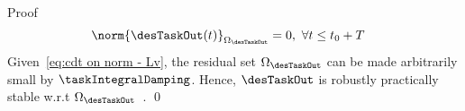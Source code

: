 \begin{custumProof}{Proof}
\begin{align}
\begin{split}
			\norm{\desTaskOut(t) }_{\Omega_\desTaskOut} &=0, \ \forall t \leq t_0 +T
		\end{split}
	\end{align}
	Given~\cref{eq:cdt on norm - Lv}, the residual set $\Omega_\desTaskOut$  can be made arbitrarily small by $\taskIntegralDamping$. Hence,  $\desTaskOut $ is robustly practically stable w.r.t $\Omega_\desTaskOut$~\cite[Defintion~3.2]{freeman1996bookRobustNNlinearControl}.
	\qed\end{custumProof}

